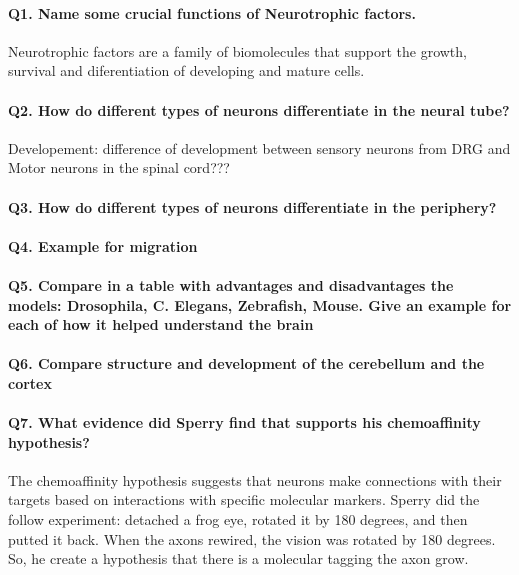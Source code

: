 \documentclass[12pt,article,oneside,a4paper]{memoir}
\begin{document}
\paragraph{Q1. Name some crucial functions of Neurotrophic factors.}
Neurotrophic factors are a family of biomolecules that support the growth, survival and diferentiation of developing and mature cells.


\paragraph{Q2. How do different types of neurons differentiate in the neural tube?}

Developement: difference of development between sensory neurons from
DRG and Motor neurons in the spinal cord???
\paragraph{Q3. How do different types of neurons differentiate in the periphery?}

\paragraph{Q4. Example for migration}

\paragraph{Q5. Compare in a table with advantages and disadvantages the models: Drosophila, C. Elegans, Zebrafish, Mouse. Give an example for each of how it helped understand the brain}

\paragraph{Q6. Compare structure and development of the cerebellum and the cortex}

\paragraph{Q7. What evidence did Sperry find that supports his chemoaffinity hypothesis?}
The chemoaffinity hypothesis suggests that neurons make connections with their targets based on interactions with specific molecular markers. Sperry did the follow experiment: detached a frog eye, rotated it by 180 degrees, and then putted it back. When the axons rewired, the vision was rotated by 180 degrees. So, he create a hypothesis that there is a molecular tagging the axon grow.
\end{document}
